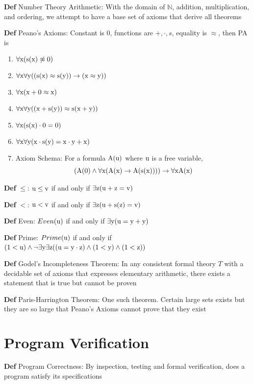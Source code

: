 \documentclass[11pt,notitlepage]{report}
\newcommand{\bb}[1]{\ensuremath{\mathbb{#1}}}
\newcommand{\tbf}[1]{\textbf{#1}}
\begin{document}
\tbf{Def} Number Theory Arithmetic: With the domain of $\bb N$, addition, multiplication, and ordering, we attempt to have a base set of axioms that derive all theorems

\tbf{Def} Peano's Axioms: Constant is 0, functions are $+, \cdot, s$, equality is $\approx$, then PA is
\begin{enumerate}[label=PA\arabic*:]
    \item $\forall \rm x(s(x) \not \approx 0)$
    \item $\forall \rm x \forall y ((s(x) \approx s(y)) \to (x \approx y))$
    \item $\forall \rm x(x + 0 \approx x)$
    \item $\forall \rm x \forall y ((x + s(y)) \approx s(x+y))$
    \item $\forall \rm x(s(x) \cdot 0 = 0)$
    \item $\forall \rm x \forall y (x \cdot s(y) = x \cdot y + x)$
    \item Axiom Schema: For a formula $\rm A(u)$ where $\rm u$ is a free variable,
    $$\rm (A(0) \wedge \forall x(A(x) \to A(s(x)))) \to \forall x A(x)$$
\end{enumerate}

\tbf{Def} $\leq$: $\rm u \leq v$ if and only if $\rm \exists z(u + z = v)$

\tbf{Def} $<$: $\rm u <v$ if and only if $\rm \exists z(u + s(z) = v)$

\tbf{Def} Even: $Even \rm (u)$ if and only if $\rm \exists y(u = y + y)$

\tbf{Def} Prime: $Prime \rm (u)$ if and only if $\rm (1 < u) \wedge \neg \exists y \exists z ((u = y \cdot z) \wedge (1 < y) \wedge (1 < z))$

\tbf{Def} Godel's Incompleteness Theorem: In any consistent formal theory $T$ with a decidable set of axioms that expresses elementary arithmetic, there exists a statement that is true but cannot be proven

\tbf{Def} Paris-Harrington Theorem: One such theorem. Certain large sets exists but they are so large that Peano's Axioms cannot prove that they exist

\newpage
\section{Program Verification}

\tbf{Def} Program Correctness: By inspection, testing and formal verification, does a program satisfy its specifications
\end{document}
